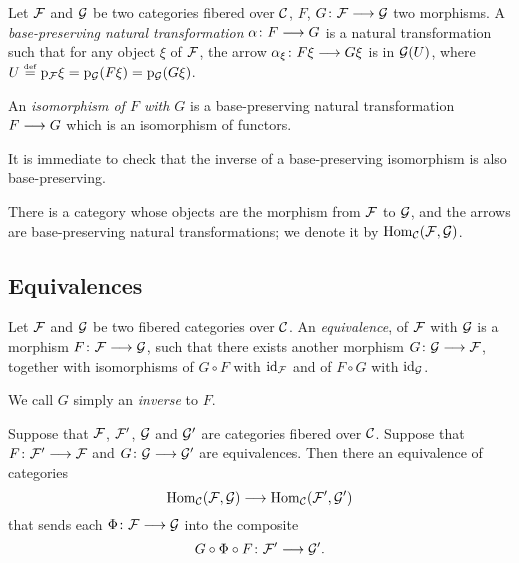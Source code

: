 \begin{3   FIBERED CATEGORIES}
\begin{3.5 Equivalences of fibered categories}
\begin{definition}\label{def:morfunctors} Let $\mathcal{F}$ and $\mathcal{G}$ be two categories fibered over $\mathcal{C}$, $F$, $G \colon \cF \arr \cG$ two morphisms. A \emph{base-preserving natural transformation}  $\alpha\colon F \arr G$ is a natural transformation such that for any object $\xi$ of $\mathcal{F}$, the arrow $\alpha_\xi \colon F \xi \arr G \xi$ is in $\mathcal{G}(U)$, where $U \overset{\mathrm{\scriptscriptstyle def}} = \mathrm{p}_{\mathcal{F}} \xi = \mathrm{p}_{\mathcal{G}}(F \xi) = \mathrm{p}_{\mathcal{G}}(G \xi)$.

An \emph{isomorphism of $F$ with $G$} is a base-preserving natural transformation $F \arr G$ which is an isomorphism of functors. 
\end{definition}


It is immediate to check that the inverse of a base-preserving isomorphism is also base-preserving.

There is a category whose objects are the morphism from $\mathcal{F}$ to $\mathcal{G}$, and the arrows are base-preserving natural transformations; we denote it by $\operatorname{Hom}_{\mathcal{C}}(\mathcal{F}, \mathcal{G})$.



\subsection{Equivalences}

\begin{definition} Let $\mathcal{F}$ and $\mathcal{G}$ be two fibered categories over $\mathcal{C}$. An \emph{equivalence}, of $\mathcal{F}$ with $\mathcal{G}$ is a morphism $F \colon \cF \arr \cG$, such that there exists another morphism $G \colon \cG \arr \cF$, together with isomorphisms of $G \circ F$ with $\mathrm{id}_{\mathcal{F}}$ and of $F \circ G$ with $\mathrm{id}_{\mathcal{G}}$.

We call $G$ simply an \emph{inverse} to $F$.
\end{definition}

\begin{proposition}\label{prop:equiv->equivalenthom}
Suppose that $\mathcal{F}$, $\mathcal{F}'$, $\mathcal{G}$ and $\mathcal{G}'$ are categories fibered over $\mathcal{C}$. Suppose  that $F \colon \cF' \arr \cF$ and $G \colon \cG \arr \cG'$ are equivalences. Then there an equivalence of categories
   \[
   \hom_{\cC}(\cF, \cG) \arr
   \hom_{\cC}(\cF', \cG')
   \]
that sends each $\Phi \colon \cF \arr \cG$ into the composite
   \[
   G \circ \Phi \circ F \colon \cF' \arr \cG'.
   \]
\end{proposition}


\end{3.5 Equivalences of fibered categories}
\end{3   FIBERED CATEGORIES}
